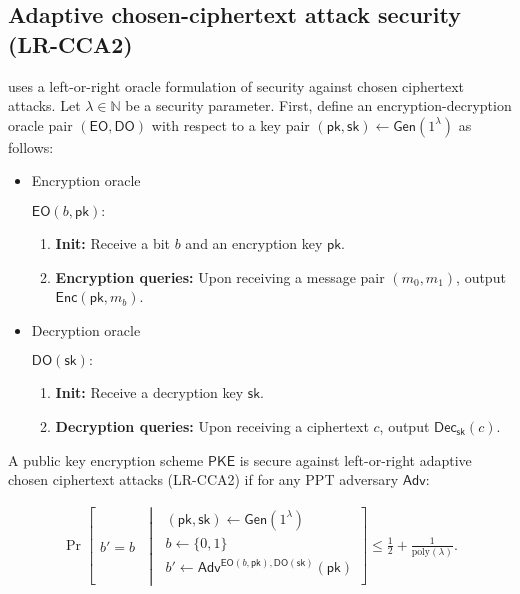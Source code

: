 \documentclass[11pt,letterpaper]{article}
\theoremstyle{plain} %
\theoremstyle{definition} %
\theoremstyle{remark} %
\newcommand{\SecParam}{\lambda}
\newcommand{\PKE}{\mathsf{PKE}}
\newcommand{\Gen}{\mathsf{Gen}}
\newcommand{\Enc}{\mathsf{Enc}}
\newcommand{\Dec}{\mathsf{Dec}}
\newcommand{\EncKey}{\mathsf{pk}}
\newcommand{\DecKey}{\mathsf{sk}}
\newcommand{\GuessBit}{b'}
\newcommand{\ChallengerBit}{b}
\newcommand{\EncOracle}{\mathsf{EO}}
\newcommand{\DecOracle}{\mathsf{DO}}
\newcommand{\Msg}{m}
\newcommand{\Ciphertext}{c}
\newcommand{\Adversary}{{\mathsf{Adv}}} %
\newcommand{\pST}{\; \middle| \;}
\newcommand{\poly}{\mathrm{poly}}
\newcommand{\Bits}{\{0,1\}}
\newcommand{\Naturals}{\mathbb{N}}
\begin{document}
\subsection{Adaptive chosen-ciphertext attack security (LR-CCA2)}

\cite{CanettiF01} uses a left-or-right oracle formulation of security against chosen ciphertext attacks. Let $\SecParam\in\Naturals$ be a security parameter. First, define an encryption-decryption oracle pair $(\EncOracle, \DecOracle)$ with respect to a key pair $(\EncKey,\DecKey) \gets \Gen(1^\SecParam)$ as follows:
\begin{itemize}
	\item Encryption oracle

	\begin{minipage}{0.9\textwidth}
	$\EncOracle(\ChallengerBit,\EncKey):$
	\begin{enumerate}[nolistsep]
		\item \textbf{Init:} Receive a bit $\ChallengerBit$ and an encryption key $\EncKey$.
		\item \textbf{Encryption queries:} Upon receiving a message pair $(\Msg_0, \Msg_1)$, output $\Enc(\EncKey,\Msg_{\ChallengerBit})$.
	\end{enumerate}
	\end{minipage}

	\item Decryption oracle

	\begin{minipage}{0.9\textwidth}
	$\DecOracle(\DecKey):$
	\begin{enumerate}[nolistsep]
		\item \textbf{Init:} Receive a decryption key $\DecKey$.
		\item \textbf{Decryption queries:} Upon receiving a ciphertext $\Ciphertext$, output $\Dec_{\DecKey}(\Ciphertext)$.
	\end{enumerate}
	\end{minipage}
\end{itemize}


A public key encryption scheme $\PKE$ is secure against left-or-right adaptive chosen ciphertext attacks (LR-CCA2) if for any PPT adversary $\Adversary$:

\begin{align*}
	\Pr \left[
	\begin{array}{c}
		\GuessBit = \ChallengerBit
	\end{array}
	\pST
	\begin{array}{r}
		(\EncKey, \DecKey) \gets \Gen(1^{\SecParam})\\
		\ChallengerBit \gets \Bits\\
		\GuessBit \gets \Adversary^{\EncOracle(\ChallengerBit,\EncKey), \DecOracle(\DecKey)}(\EncKey)\\
	\end{array}
	\right] \leq \frac{1}{2} + \frac{1}{\poly(\SecParam)}.
\end{align*}
\end{document}
